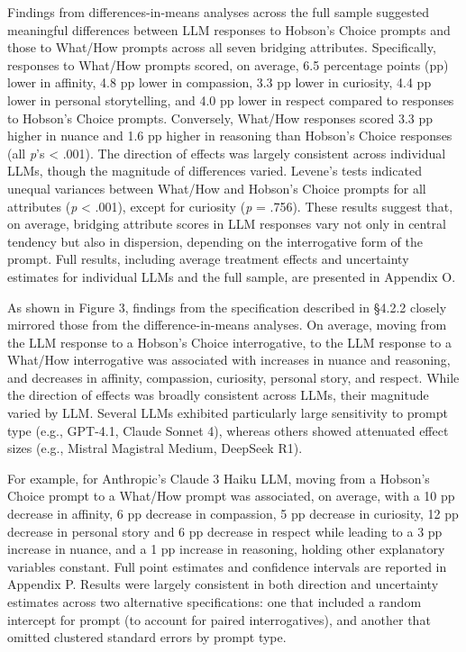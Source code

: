 \documentclass[
  12pt,
]{article}
\begin{document}
Findings from differences-in-means analyses across the full sample suggested meaningful differences between LLM responses to Hobson's Choice prompts and those to What/How prompts across all seven bridging attributes. Specifically, responses to What/How prompts scored, on average, 6.5 percentage points (pp) lower in affinity, 4.8 pp lower in compassion, 3.3 pp lower in curiosity, 4.4 pp lower in personal storytelling, and 4.0 pp lower in respect compared to responses to Hobson's Choice prompts. Conversely, What/How responses scored 3.3 pp higher in nuance and 1.6 pp higher in reasoning than Hobson's Choice responses (all \emph{p}'s \textless{} .001). The direction of effects was largely consistent across individual LLMs, though the magnitude of differences varied. Levene's tests indicated unequal variances between What/How and Hobson's Choice prompts for all attributes (\emph{p} \textless{} .001), except for curiosity (\emph{p} = .756). These results suggest that, on average, bridging attribute scores in LLM responses vary not only in central tendency but also in dispersion, depending on the interrogative form of the prompt. Full results, including average treatment effects and uncertainty estimates for individual LLMs and the full sample, are presented in Appendix O.

As shown in Figure 3, findings from the specification described in §4.2.2 closely mirrored those from the difference-in-means analyses. On average, moving from the LLM response to a Hobson's Choice interrogative, to the LLM response to a What/How interrogative was associated with increases in nuance and reasoning, and decreases in affinity, compassion, curiosity, personal story, and respect. While the direction of effects was broadly consistent across LLMs, their magnitude varied by LLM. Several LLMs exhibited particularly large sensitivity to prompt type (e.g., GPT-4.1, Claude Sonnet 4), whereas others showed attenuated effect sizes (e.g., Mistral Magistral Medium, DeepSeek R1).

For example, for Anthropic's Claude 3 Haiku LLM, moving from a Hobson's Choice prompt to a What/How prompt was associated, on average, with a 10 pp decrease in affinity, 6 pp decrease in compassion, 5 pp decrease in curiosity, 12 pp decrease in personal story and 6 pp decrease in respect while leading to a 3 pp increase in nuance, and a 1 pp increase in reasoning, holding other explanatory variables constant. Full point estimates and confidence intervals are reported in Appendix P. Results were largely consistent in both direction and uncertainty estimates across two alternative specifications: one that included a random intercept for prompt (to account for paired interrogatives), and another that omitted clustered standard errors by prompt type.
\end{document}
